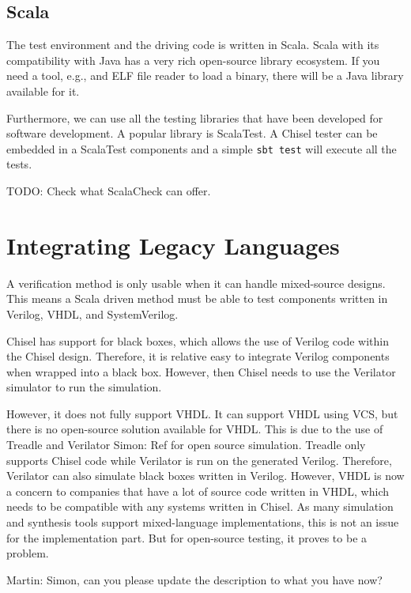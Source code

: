 \documentclass[conference]{IEEEtran}
\newcommand{\code}[1]{{\small{\texttt{#1}}}}
\newcommand{\todo}[1]{{\color{olive} TODO: #1}}
\newcommand{\martin}[1]{{\color{blue} Martin: #1}}
\newcommand{\simon}[1]{{\color{green} Simon: #1}}
\begin{document}
\subsection{Scala}

The test environment and the driving code is written in Scala. Scala with its
compatibility with Java has a very rich open-source library ecosystem.
If you need a tool, e.g., and ELF file reader to load a binary, there will be a Java
library available for it.

Furthermore, we can use all the testing libraries that have been developed for
software development. A popular library is ScalaTest. A Chisel tester can be embedded
in a ScalaTest components and a simple \code{sbt test} will execute all the tests.

\todo{Check what ScalaCheck can offer.}

\section{Integrating Legacy Languages}

A verification method is only usable when it can handle mixed-source designs.
This means a Scala driven method must be able to test components written in Verilog,
VHDL, and SystemVerilog.

Chisel has support for black boxes, which allows the use of Verilog code within the Chisel design.
Therefore, it is relative easy to integrate Verilog components when wrapped into a black box.
However, then Chisel needs to use the Verilator simulator to run the simulation.


However, it does not fully support VHDL. It can support VHDL using VCS, but there is no
open-source solution available for VHDL.
This is due to the use of Treadle and Verilator \simon{Ref} for open source simulation.
Treadle only supports Chisel code while Verilator is run on the generated Verilog.
Therefore, Verilator can also simulate black boxes written in Verilog.
However, VHDL is now a concern to companies that have a lot of source code written in VHDL,
which needs to be compatible with any systems written in Chisel.
As many simulation and synthesis tools support mixed-language implementations,
this is not an issue for the implementation part. But for open-source testing, it proves to be a problem.

\martin{Simon, can you please update the description to what you have now?}
\end{document}
